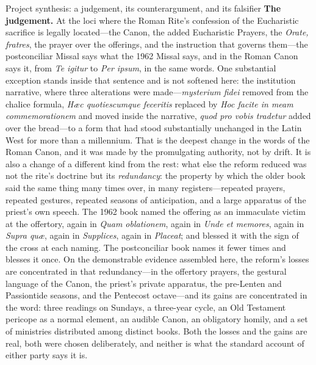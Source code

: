 \begin{studybox}{Project synthesis: a judgement, its counterargument, and its falsifier}
\textbf{The judgement.} At the loci where the Roman Rite's confession of the Eucharistic sacrifice is legally located---the Canon, the added Eucharistic Prayers, the \emph{Orate, fratres}, the prayer over the offerings, and the instruction that governs them---the postconciliar Missal says what the 1962 Missal says, and in the Roman Canon says it, from \emph{Te igitur} to \emph{Per ipsum}, in the same words. One substantial exception stands inside that sentence and is not softened here: the institution narrative, where three alterations were made---\emph{mysterium fidei} removed from the chalice formula, \emph{Hæc quotiescumque feceritis} replaced by \emph{Hoc facite in meam commemorationem} and moved inside the narrative, \emph{quod pro vobis tradetur} added over the bread---to a form that had stood substantially unchanged in the Latin West for more than a millennium. That is the deepest change in the words of the Roman Canon, and it was made by the promulgating authority, not by drift. It is also a change of a different kind from the rest: what else the reform reduced was not the rite's doctrine but its \emph{redundancy}: the property by which the older book said the same thing many times over, in many registers---repeated prayers, repeated gestures, repeated seasons of anticipation, and a large apparatus of the priest's own speech. The 1962 book named the offering as an immaculate victim at the offertory, again in \emph{Quam oblationem}, again in \emph{Unde et memores}, again in \emph{Supra quæ}, again in \emph{Supplices}, again in \emph{Placeat}; and blessed it with the sign of the cross at each naming. The postconciliar book names it fewer times and blesses it once. On the demonstrable evidence assembled here, the reform's losses are concentrated in that redundancy---in the offertory prayers, the gestural language of the Canon, the priest's private apparatus, the pre-Lenten and Passiontide seasons, and the Pentecost octave---and its gains are concentrated in the word: three readings on Sundays, a three-year cycle, an Old Testament pericope as a normal element, an audible Canon, an obligatory homily, and a set of ministries distributed among distinct books. Both the losses and the gains are real, both were chosen deliberately, and neither is what the standard account of either party says it is.


\end{studybox}
